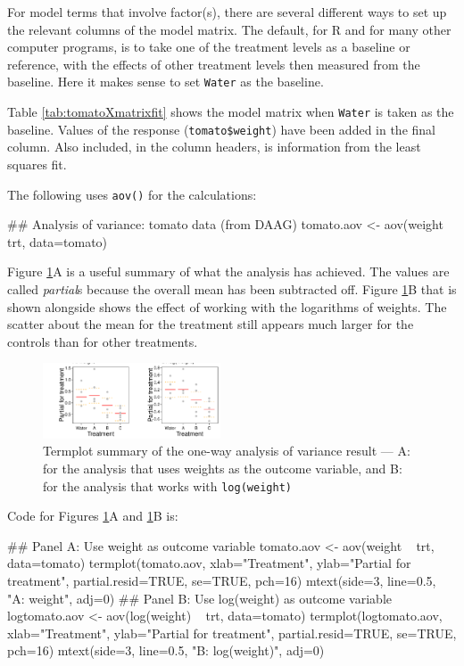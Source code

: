 \documentclass{tufte-book}\usepackage[]{graphicx}\usepackage[]{color}
\newcommand{\txtt}[1]{\texttt{#1}}
\begin{document}
For model terms that involve factor(s), there are several different
ways to set up the relevant columns of the model matrix.  The default,
for R and for many other computer programs, is to take one of the
treatment levels as a baseline or reference, with the effects of other
treatment levels then measured from the baseline.  Here it makes sense
to set \verb!Water! as the baseline.

Table \ref{tab:tomatoXmatrixfit} shows the model matrix when
\verb!Water! is taken as the baseline.  Values of the response
(\verb!tomato$weight!)  have been added in the final column. Also
included, in the column headers, is information from the least squares
fit.

The following uses \txtt{aov()} for the calculations:
\begin{Schunk}
\begin{Sinput}
## Analysis of variance: tomato data (from DAAG)
tomato.aov <- aov(weight ~ trt, data=tomato)
\end{Sinput}
\end{Schunk}

Figure \ref{fig:tomatoterm}A is a useful summary of what the analysis
has achieved. The values are called {\em partial}s because the
overall mean has been  subtracted off.  Figure \ref{fig:tomatoterm}B
that is shown alongside shows the effect of working with the logarithms
of weights.  The scatter  about the mean for the treatment still
appears much larger for the controls than for other treatments.
\begin{figure}
\begin{Schunk}


\centerline{\includegraphics[width=0.47\textwidth]{figs/11-termplot-aovAB-1} }

\end{Schunk}
 \caption{Termplot summary of the one-way analysis of variance result ---
A: for the analysis that uses weights as the outcome variable, and
B: for the analysis that works with \txtt{log(weight)}}
\label{fig:tomatoterm}
\end{figure}

\noindent
Code for Figures \ref{fig:tomatoterm}A and \ref{fig:tomatoterm}B is:
\begin{Schunk}
\begin{Sinput}
## Panel A: Use weight as outcome variable
tomato.aov <- aov(weight ~ trt, data=tomato)
termplot(tomato.aov, xlab="Treatment",
         ylab="Partial for treatment",
         partial.resid=TRUE, se=TRUE, pch=16)
mtext(side=3, line=0.5, "A: weight", adj=0)
## Panel B: Use log(weight) as outcome variable
logtomato.aov <- aov(log(weight) ~ trt, data=tomato)
termplot(logtomato.aov, xlab="Treatment",
         ylab="Partial for treatment",
         partial.resid=TRUE, se=TRUE, pch=16)
mtext(side=3, line=0.5, "B: log(weight)", adj=0)
\end{Sinput}
\end{Schunk}
\end{document}
